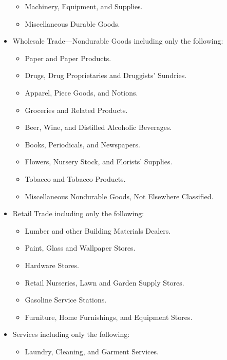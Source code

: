 \begin{itemize}
\begin{itemize}
\item Machinery, Equipment, and Supplies.

\item Miscellaneous Durable Goods.
\end{itemize}
\item Wholesale Trade---Nondurable Goods including only the following:
\begin{itemize}
\item Paper and Paper Products.

\item Drugs, Drug Proprietaries and Druggists' Sundries.

\item Apparel, Piece Goods, and Notions.

\item Groceries and Related Products.

\item Beer, Wine, and Distilled Alcoholic Beverages.

\item Books, Periodicals, and Newspapers.

\item Flowers, Nursery Stock, and Florists' Supplies.

\item Tobacco and Tobacco Products.

\item Miscellaneous Nondurable Goods, Not Elsewhere Classified.
\end{itemize}
\item Retail Trade including only the following:
\begin{itemize}
\item Lumber and other Building Materials Dealers.

\item Paint, Glass and Wallpaper Stores.

\item Hardware Stores.

\item Retail Nurseries, Lawn and Garden Supply Stores.

\item Gasoline Service Stations.

\item Furniture, Home Furnishings, and Equipment Stores.
\end{itemize}
\item Services including only the following:
\begin{itemize}
\item Laundry, Cleaning, and Garment Services.


\end{itemize}
\end{itemize}
